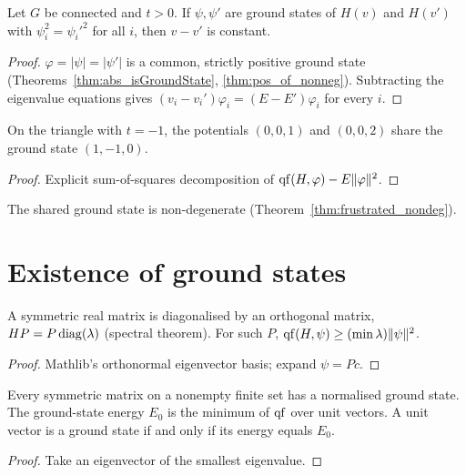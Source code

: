 \begin{theorem}
  \label{thm:hk_single_particle}
  \leanok
  Let $G$ be connected and $t>0$. If $\psi,\psi'$ are ground states of $H(v)$ and $H(v')$ with
  $\psi_i^2=\psi_i'^2$ for all $i$, then $v-v'$ is constant.
\end{theorem}
\begin{proof}
  \leanok
  $\varphi=|\psi|=|\psi'|$ is a common, strictly positive ground state
  (Theorems~\ref{thm:abs_isGroundState}, \ref{thm:pos_of_nonneg}). Subtracting the eigenvalue equations
  gives $(v_i-v_i')\varphi_i=(E-E')\varphi_i$ for every $i$.
\end{proof}

\begin{theorem}
  \label{thm:hk_fails_frustrated}
  \leanok
  On the triangle with $t=-1$, the potentials $(0,0,1)$ and $(0,0,2)$ share the ground state $(1,-1,0)$.
\end{theorem}
\begin{proof}
  \leanok
  Explicit sum-of-squares decomposition of $\operatorname{qf}(H,\varphi)-E\|\varphi\|^2$.
\end{proof}
The shared ground state is non-degenerate (Theorem~\ref{thm:frustrated_nondeg}).

\section{Existence of ground states}

\begin{theorem}
  \label{thm:qf_ge_of_diagonalisation}
  \leanok
  A symmetric real matrix is diagonalised by an orthogonal matrix, $HP=P\operatorname{diag}(\lambda)$ (spectral
  theorem). For such $P$, $\operatorname{qf}(H,\psi)\ge(\min\lambda)\|\psi\|^2$.
\end{theorem}
\begin{proof}
  \leanok
  Mathlib's orthonormal eigenvector basis; expand $\psi=Pc$.
\end{proof}

\begin{theorem}
  \label{thm:exists_groundState}
  \leanok
  Every symmetric matrix on a nonempty finite set has a normalised ground state. The ground-state energy
  $E_0$ is the minimum of $\operatorname{qf}$ over unit vectors. A unit vector is a ground state if and only if its energy
  equals $E_0$.
\end{theorem}
\begin{proof}
  \leanok
  Take an eigenvector of the smallest eigenvalue.
\end{proof}
